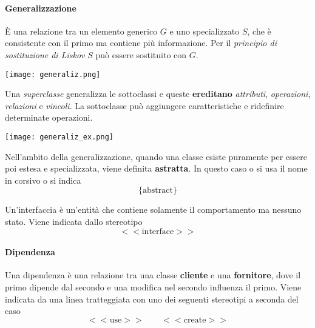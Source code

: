 \paragraph{Generalizzazione}
È una relazione tra un elemento generico $G$ e uno specializzato $S$, che è consistente con il primo ma contiene più informazione. Per il \textit{principio di sostituzione di Liskov} $S$ può essere sostituito con $G$.
\begin{center}
	\texttt{[image: generaliz.png]}
\end{center}
Una \textit{superclasse} generalizza le sottoclassi e queste \textbf{ereditano} \textit{attributi}, \textit{operazioni}, \textit{relazioni} e \textit{vincoli}. La sottoclasse può aggiungere caratteristiche e ridefinire determinate operazioni.
\begin{center}
	\texttt{[image: generaliz\_ex.png]}
\end{center}

\begin{definition}
	Nell'ambito della generalizzazione, quando una classe esiste puramente per essere poi estesa e specializzata, viene definita \textbf{astratta}. In questo caso o si usa il nome in corsivo o si indica 
	\begin{equation*}
		\{\text{abstract}\}
	\end{equation*}
\end{definition}

\begin{definition}[Interfaccia]
	Un'interfaccia è un'entità che contiene solamente il comportamento ma nessuno stato. Viene indicata dallo stereotipo
	\begin{equation*}
		<<\text{interface}>>
	\end{equation*}
\end{definition}

\paragraph{Dipendenza}
Una dipendenza è una relazione tra una classe \textbf{cliente} e una \textbf{fornitore}, dove il primo dipende dal secondo e una modifica nel secondo influenza il primo. Viene indicata da una linea tratteggiata con uno dei seguenti stereotipi a seconda del caso
\begin{equation*}
	<<\text{use}>> \qquad <<\text{create}>>
\end{equation*}

